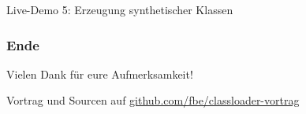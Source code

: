 \documentclass[aspectratio=169]{beamer}
\begin{document}
	\begin{frame}
		Live-Demo 5: Erzeugung synthetischer Klassen
	\end{frame}

	
	\begin{frame}
		\frametitle{Ende}
		
		\begin{center}
			Vielen Dank für eure Aufmerksamkeit!
			\par
			Vortrag und Sourcen auf \href{https://github.com/fbe/classloader-vortrag}{github.com/fbe/classloader-vortrag}
		\end{center}

	\end{frame}
\end{document}
